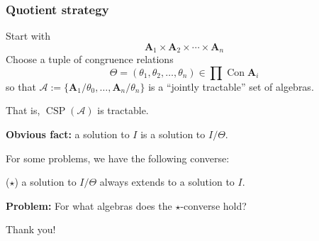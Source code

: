 \documentclass[10pt,xcolor=dvipsnames%
   ]{beamer}
\DeclareMathOperator{\Con}{Con}
\DeclareMathOperator{\CSP}{CSP}
\renewcommand{\.}{\cdot}
\newcommand{\sA}{\ensuremath{\mathcal{A}}}
\newcommand{\bA}{\ensuremath{\mathbf{A}}}
\begin{document}
\begin{frame}
    \frametitle{Quotient strategy}
  Start with
  \[
  \bA_1 \times \bA_2 \times \cdots \times \bA_n
  \]
  Choose a tuple of congruence relations
  \[
  \Theta = (\theta_1, \theta_2,  \dots, \theta_n) \in \prod \Con \bA_i
  \]
  so that $\sA := \{\bA_1/\theta_0, \dots, \bA_n/\theta_n\}$
  is a ``jointly tractable'' set of algebras.

  That is, $\CSP(\sA)$ is tractable.

  {\bf Obvious fact:} a solution to $I$ is a solution to $I/\Theta$.

  For some problems, we have the following converse:

  ({\large $\star$}) a solution to $I/\Theta$
  always extends to a solution to $I$. 

  {\bf Problem:} For what algebras does the {\large $\star$}-converse hold?
  \pause

\hfill  Thank you!
\end{frame}
\end{document}
